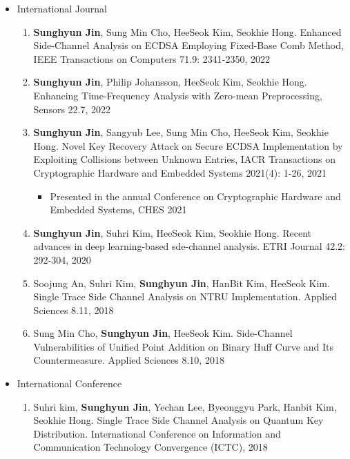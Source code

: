 \documentclass[a4paper,20pt]{article}
\begin{document}
\begin{itemize}
    \item {International Journal}
        \vspace{-6pt}
        \begin{enumerate}
            \item {\textbf{Sunghyun Jin}, Sung Min Cho, HeeSeok Kim, Seokhie Hong. Enhanced Side-Channel Analysis on ECDSA Employing Fixed-Base Comb Method, IEEE Transactions on Computers 71.9: 2341-2350, 2022}
            \item {\textbf{Sunghyun Jin}, Philip Johansson, HeeSeok Kim, Seokhie Hong. Enhancing Time-Frequency Analysis with Zero-mean Preprocessing, Sensors 22.7, 2022}
            \vspace{-2pt}
            \item {\textbf{Sunghyun Jin}, Sangyub Lee, Sung Min Cho, HeeSeok Kim, Seokhie Hong. Novel Key Recovery Attack on Secure ECDSA Implementation by Exploiting Collisions between Unknown Entries, IACR Transactions on Cryptographic Hardware and Embedded Systems 2021(4): 1-26, 2021}
            \vspace{-2pt}
            \begin{itemize}
                \item {Presented in the annual Conference on Cryptographic Hardware and Embedded Systems, CHES 2021}
            \end{itemize}
            \vspace{-2pt}
            \item {\textbf{Sunghyun Jin}, Suhri Kim, HeeSeok Kim, Seokhie Hong. Recent advances in deep learning-based sde-channel analysis. ETRI Journal 42.2: 292-304, 2020}
            \vspace{-2pt}
            \item {Soojung An, Suhri Kim, \textbf{Sunghyun Jin}, HanBit Kim, HeeSeok Kim. Single Trace Side Channel Analysis on NTRU Implementation. Applied Sciences 8.11, 2018}
            \vspace{-2pt}
            \item {Sung Min Cho, \textbf{Sunghyun Jin}, HeeSeok Kim. Side-Channel Vulnerabilities of Unified Point Addition on Binary Huff Curve and Its Countermeasure. Applied Sciences 8.10, 2018}
            \vspace{-2pt}
        \end{enumerate}
        
    \item {International Conference}
        \vspace{-6pt}
        \begin{enumerate}
            \item {Suhri kim, \textbf{Sunghyun Jin}, Yechan Lee, Byeonggyu Park, Hanbit Kim, Seokhie Hong. Single Trace Side Channel Analysis on Quantum Key Distribution. International Conference on Information and Communication Technology Convergence (ICTC), 2018}
            \vspace{-2pt}
        \end{enumerate}
        

\end{itemize}
\end{document}
